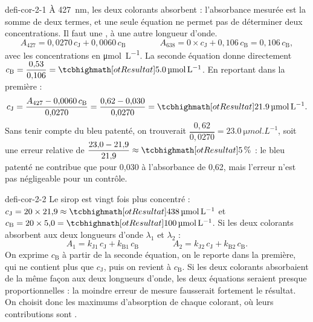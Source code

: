 \begin{blocEdition}{defi-cor-2-1}
À \qty{427}{nm}, les deux colorants absorbent : l'absorbance mesurée est la somme de deux termes, et une seule équation ne
permet pas de déterminer deux concentrations. Il faut une , à une autre longueur d'onde.
\[A_{427}=0{,}0270\,c_\mathrm{J}+0{,}0060\,c_\mathrm{B}\qquad\qquad A_{638}=0\times c_\mathrm{J}+0{,}106\,c_\mathrm{B}=0{,}106\,c_\mathrm{B},\]
avec les concentrations en \unit{\micro mol.L^{-1}}.
La seconde équation donne directement $c_\mathrm{B}=\dfrac{0{,}53}{0{,}106}=\res{\qty{5,0}{\micro mol.L^{-1}}}$. En reportant dans la première :
\[c_\mathrm{J}=\frac{A_{427}-0{,}0060\,c_\mathrm{B}}{0{,}0270}=\frac{0{,}62-0{,}030}{0{,}0270}=\res{\qty{21,9}{\micro mol.L^{-1}}}.\]
Sans tenir compte du bleu patenté, on trouverait $\dfrac{0{,}62}{0{,}0270}=\qty{23,0}{\micro mol.L^{-1}}$, soit une erreur relative de
$\dfrac{23{,}0-21{,}9}{21{,}9}\approx\res{\qty{5}{\percent}}$ : le bleu patenté ne contribue que pour 0,030 à l'absorbance de 0,62, mais l'erreur
n'est pas négligeable pour un contrôle.
\end{blocEdition}

\begin{blocEdition}{defi-cor-2-2}
\label{figedition-defi-cor-2-2-1}
Le sirop est vingt fois plus concentré : $c_\mathrm{J}=20\times21{,}9\approx\res{\qty{438}{\micro mol.L^{-1}}}$ et $c_\mathrm{B}=20\times5{,}0=\res{\qty{100}{\micro mol.L^{-1}}}$.
Si les deux colorants absorbent aux deux longueurs d'onde $\lambda_1$ et $\lambda_2$ :
\[A_1=k_{\mathrm{J}1}\,c_\mathrm{J}+k_{\mathrm{B}1}\,c_\mathrm{B}\qquad\qquad A_2=k_{\mathrm{J}2}\,c_\mathrm{J}+k_{\mathrm{B}2}\,c_\mathrm{B}.\]
On exprime $c_\mathrm{B}$ à partir de la seconde équation, on le reporte dans la première, qui ne contient plus que $c_\mathrm{J}$, puis on
revient à $c_\mathrm{B}$. Si les deux colorants absorbaient de la même façon aux deux longueurs d'onde, les deux équations
seraient presque proportionnelles : la moindre erreur de mesure fausserait fortement le résultat. On choisit donc les
maximums d'absorption de chaque colorant, où leurs contributions sont .
\end{blocEdition}

